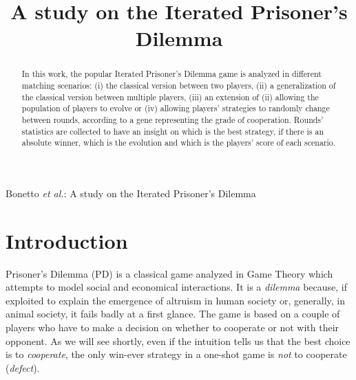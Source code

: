 \documentclass[journal,10pt,twoside]{IEEEtran}
\begin{document}

\title{A study on the Iterated Prisoner's Dilemma}
\author{%

}
%
    {Bonetto \MakeLowercase{\textit{et al.}}: A study on the Iterated Prisoner's Dilemma}

\maketitle

\begin{abstract}
In this work, the popular Iterated Prisoner's Dilemma game is analyzed in different matching scenarios: (i) the classical version between two players, (ii) a generalization of the classical version between multiple players, (iii) an extension of (ii) allowing the population of players to evolve or (iv) allowing players' strategies to randomly change between rounds, according to a gene representing the grade of cooperation. %
Rounds' statistics are collected to have an insight on which is the best strategy, if there is an absolute winner, which is the evolution and which is the players' score of each scenario.
\end{abstract}

\section{Introduction} \label{s:intro}
 Prisoner's Dilemma (PD) is a classical game analyzed in Game Theory which attempts to model social and economical interactions. It is a \textit{dilemma} because, if exploited to explain the emergence of altruism in human society or, generally, in animal society, it fails badly at a first glance. The game is based on a couple of players who have to make a decision on whether to cooperate or not with their opponent. As we will see shortly, even if the intuition tells us that the best choice is to \textit{cooperate}, the only win-ever strategy in a one-shot game is  \textit{not} to cooperate (\textit{defect}).
\end{document}
